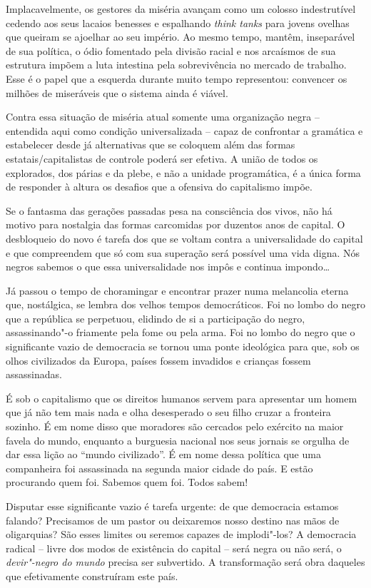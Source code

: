 Implacavelmente, os gestores da miséria avançam como um colosso
indestrutível cedendo aos seus lacaios benesses e espalhando \emph{think
tanks} para jovens ovelhas que queiram se ajoelhar ao seu império. Ao
mesmo tempo, mantêm, inseparável de sua política, o ódio fomentado pela
divisão racial e nos arcaísmos de sua estrutura impõem a luta intestina
pela sobrevivência no mercado de trabalho. Esse é o papel que a esquerda
durante muito tempo representou: convencer os milhões de miseráveis que
o sistema ainda é viável.

Contra essa situação de miséria atual somente uma organização negra --
entendida aqui como condição universalizada -- capaz de confrontar a
gramática e estabelecer desde já alternativas que se coloquem além das
formas estatais/capitalistas de controle poderá ser efetiva. A união de
todos os explorados, dos párias e da plebe, e não a unidade
programática, é a única forma de responder à altura os desafios que a
ofensiva do capitalismo impõe.

Se o fantasma das gerações passadas pesa na consciência dos vivos, não
há motivo para nostalgia das formas carcomidas por duzentos anos de
capital. O desbloqueio do novo é tarefa dos que se voltam contra a
universalidade do capital e que compreendem que só com sua superação
será possível uma vida digna. Nós negros sabemos o que essa
universalidade nos impôs e continua impondo\ldots{}

Já passou o tempo de choramingar e encontrar prazer numa melancolia
eterna que, nostálgica, se lembra dos velhos tempos democráticos. Foi no
lombo do negro que a república se perpetuou, elidindo de si a
participação do negro, assassinando"-o friamente pela fome ou pela arma.
Foi no lombo do negro que o
significante vazio de democracia se tornou uma ponte ideológica para
que, sob os olhos civilizados da Europa, países fossem invadidos e
crianças fossem assassinadas.

É sob o capitalismo que os direitos humanos servem para apresentar um
homem que já não tem mais nada e olha desesperado o seu filho cruzar a
fronteira sozinho. É em nome disso que moradores são cercados pelo
exército na maior favela do mundo, enquanto a burguesia nacional nos
seus jornais se orgulha de dar essa lição ao ``mundo civilizado''. É em
nome dessa política que uma companheira foi assassinada na segunda maior
cidade do país. E estão procurando quem foi. Sabemos quem foi. Todos
sabem!

Disputar esse significante vazio é tarefa urgente: de que democracia
estamos falando? Precisamos de um pastor ou deixaremos nosso destino nas
mãos de oligarquias? São esses limites ou seremos capazes de
implodi"-los? A democracia radical -- livre dos modos de existência do
capital -- será negra ou não será, o \emph{devir"-negro do mundo} precisa
ser subvertido. A transformação será obra daqueles que efetivamente
construíram este país.

